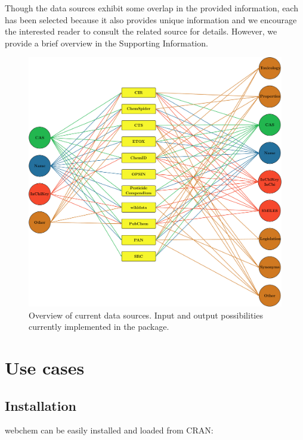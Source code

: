Though the data sources exhibit some overlap in the provided information, each has been selected because it also provides unique information and we encourage the interested reader to consult the related source for details. 
However, we provide a brief overview in the Supporting Information.

\begin{figure}[H]
  \centering
  \includegraphics[width=\textwidth]{chapters/webchem/fig1.pdf}
  \caption[Overview of current data sources.]{Overview of current data sources. Input and output possibilities currently implemented in the package.}
  \label{fig:fig1}
\end{figure}

\newpage
\section[Use cases]{Use cases}
\subsection[Install webchem]{Installation}
webchem can be easily installed and loaded from CRAN:

\begin{knitrout}
\color{fgcolor}\begin{kframe}
\begin{alltt}
\hlstd{(}\hlstd{)}
\hlstd{(}\hlstd{)}
\end{alltt}
\end{kframe}
\end{knitrout}




